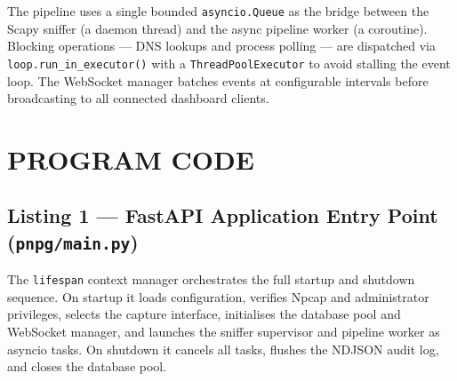 \documentclass[12pt]{article}
\begin{document}
\noindent The pipeline uses a single bounded \texttt{asyncio.Queue} as the
bridge between the Scapy sniffer (a daemon thread) and the async pipeline
worker (a coroutine). Blocking operations --- DNS lookups and process polling
--- are dispatched via \texttt{loop.run\_in\_executor()} with a
\texttt{ThreadPoolExecutor} to avoid stalling the event loop. The WebSocket
manager batches events at configurable intervals before broadcasting to all
connected dashboard clients.

\newpage
\section*{PROGRAM CODE}

\subsection*{Listing 1 --- FastAPI Application Entry Point (\texttt{pnpg/main.py})}

The \texttt{lifespan} context manager orchestrates the full startup and
shutdown sequence. On startup it loads configuration, verifies Npcap and
administrator privileges, selects the capture interface, initialises the
database pool and WebSocket manager, and launches the sniffer supervisor and
pipeline worker as asyncio tasks. On shutdown it cancels all tasks, flushes
the NDJSON audit log, and closes the database pool.
\end{document}

